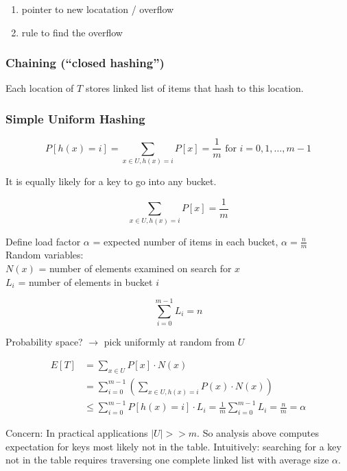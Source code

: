 \begin{enumerate}[label={(\alph*)}]
	\item pointer to new locatation / overflow
	\item rule to find the overflow
\end{enumerate}

\subsubsection*{Chaining (``closed hashing'')}

\noindent Each location of $T$ stores linked list of items that hash to this location.

\subsubsection*{Simple Uniform Hashing}

$$P[h(x) = i] = \sum_{x \in U, h(x)=i} P[x] = \frac{1}{m} \textrm{ for } i = 0,1,\ldots,m-1$$

\noindent It is equally likely for a key to go into any bucket.

$$\sum_{x \in U, h(x)=i} P[x] = \frac{1}{m}$$

\noindent Define load factor $\alpha$ = expected number of items in each bucket, $\alpha = \frac{n}{m}$ \\
Random variables: \\
\indent $N(x)$ = number of elements examined on search for $x$ \\
\indent $L_i$ = number of elements in bucket $i$

$$\sum_{i=0}^{m-1} L_i = n$$

\noindent Probability space? $\rightarrow$ pick uniformly at random from $U$

\begin{equation*}
\begin{split}
E[T] & = \sum_{x \in U} P[x] \cdot N(x) \\
& = \sum_{i = 0}^{m-1} \left ( \sum_{x \in U,h(x)=i} P(x) \cdot N(x) \right ) \\
& \leq \sum_{i=0}^{m-1} P[h(x)=i] \cdot L_i = \frac{1}{m} \sum_{i=0}^{m-1} L_i = \frac{n}{m} = \alpha
\end{split}
\end{equation*}

\noindent Concern: In practical applications $\vert U \vert >> m$. So analysis above computes expectation for keys most likely not in the table. Intuitively: searching for a key not in the table requires traversing one complete linked list with average size $\alpha$.

